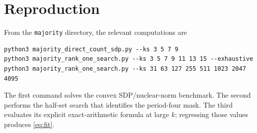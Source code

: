 \documentclass[11pt]{article}
\newcommand{\1}{\mathbf 1}
\begin{document}
\section{Reproduction}

From the \texttt{majority} directory, the relevant computations are
\begin{verbatim}
python3 majority_direct_count_sdp.py --ks 3 5 7 9
python3 majority_rank_one_search.py --ks 3 5 7 9 11 13 15 --exhaustive
python3 majority_rank_one_search.py --ks 31 63 127 255 511 1023 2047 4095
\end{verbatim}
The first command solves the convex SDP/nuclear-norm benchmark.  The second
performs the half-set search that identifies the period-four mask.  The third
evaluates its explicit exact-arithmetic formula at large $k$; regressing those
values produces \eqref{eq:fit}.
\end{document}
